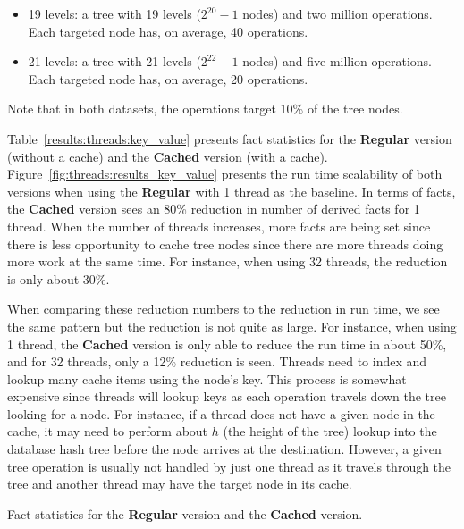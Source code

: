 \begin{itemize}
   \item 19 levels: a tree with 19 levels ($2^{20}-1$ nodes) and two million
      operations. Each targeted node has, on average, 40 operations.

   \item 21 levels: a tree with 21 levels ($2^{22}-1$ nodes) and five million
      operations. Each targeted node has, on average, 20 operations.
\end{itemize}

Note that in both datasets, the operations target 10\% of the tree nodes.

Table~\ref{results:threads:key_value} presents fact statistics for the
\textbf{Regular} version (without a cache) and the \textbf{Cached} version
(with a cache). Figure~\ref{fig:threads:results_key_value} presents the run time
scalability of both versions when using the \textbf{Regular} with 1 thread as
the baseline. In terms of facts, the \textbf{Cached} version sees an 80\%
reduction in number of derived facts for 1 thread. When the number of threads
increases, more facts are being set since there is less opportunity to cache
tree nodes since there are more threads doing more work at the same time. For
instance, when using 32 threads, the reduction is only about 30\%.

When comparing these reduction numbers to the reduction in run time, we see the
same pattern but the reduction is not quite as large. For instance, when using 1
thread, the \textbf{Cached} version is only able to reduce the run time in about
50\%, and for 32 threads, only a 12\% reduction is seen. Threads need to index
and lookup many cache items using the node's key. This process is somewhat
expensive since threads will lookup keys as each operation travels down the tree
looking for a node. For instance, if a thread does not have a given node in the
cache, it may need to perform about $h$ (the height of the tree) lookup into the
database hash tree before the node arrives at the destination.  However, a given
tree operation is usually not handled by just one thread as it travels through
the tree and another thread may have the target node in its cache.

\begin{table}[ht]
   \begin{center}
      
   \end{center}

   \caption{Fact statistics for the \textbf{Regular} version and the
   \textbf{Cached} version.}
   \label{results:threads:key_value}
\end{table}

